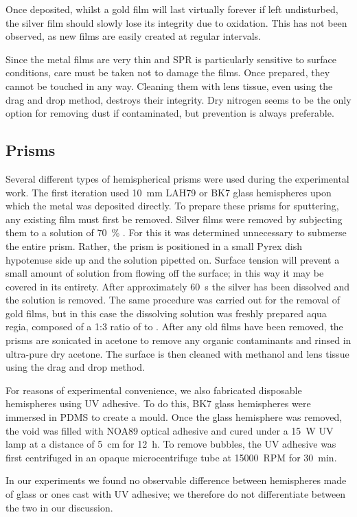 Once deposited, whilst a gold film will last virtually forever if left
undisturbed, the silver film should slowly lose its integrity due to
oxidation.  This has not been observed, as new films are easily created at
regular intervals.  

Since the metal films are very thin and SPR is particularly sensitive to
surface conditions, care must be taken not to damage the films.  Once
prepared, they cannot be touched in any way.  Cleaning them with lens
tissue, even using the drag and drop method, destroys their integrity.  Dry
nitrogen seems to be the only option for removing dust if contaminated, but
prevention is always preferable.

\subsection{Prisms}
Several different types of hemispherical prisms were used during the
experimental work.  The first iteration used \SI{10}{\milli\meter} LAH79 or
BK7 glass hemispheres upon which the metal was deposited directly.  To
prepare these prisms for sputtering, any existing film must first be
removed.  Silver films were removed by subjecting them to a solution of
\SI{70}{\percent} .  For this it was determined unnecessary to
submerse the entire prism.  Rather, the prism is positioned in a small
Pyrex dish hypotenuse side up and the  solution pipetted on.
Surface tension will prevent a small amount of solution from flowing off
the surface; in this way it may be covered in its entirety.  After
approximately \SI{60}{\second} the silver has been dissolved and the
solution is removed.  The same procedure was carried out for the removal of
gold films, but in this case the dissolving solution was freshly prepared
aqua regia, composed of a 1:3 ratio of  to .  After any
old films have been removed, the prisms are sonicated in acetone to remove
any organic contaminants and rinsed in ultra-pure dry acetone.  The surface
is then cleaned with methanol and lens tissue using the drag and drop
method.

For reasons of experimental convenience, we also fabricated disposable
hemispheres using UV adhesive.  To do this, BK7 glass hemispheres were
immersed in PDMS to create a mould.  Once the glass hemisphere was removed,
the void was filled with NOA89 optical adhesive and cured under a
\SI{15}{\watt} UV lamp at a distance of \SI{5}{\centi\meter} for
\SI{12}{\hour}.  To remove bubbles, the UV adhesive was first centrifuged
in an opaque microcentrifuge tube at \SI{15000}{RPM} for \SI{30}{\minute}.

In our experiments we found no observable difference between hemispheres
made of glass or ones cast with UV adhesive; we therefore do not
differentiate between the two in our discussion.  
